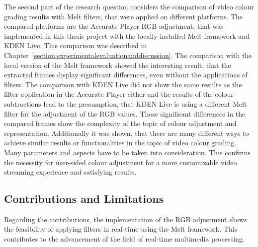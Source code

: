 \documentclass[../MasterThesis.tex]{subfiles}
\begin{document}
The second part of the research question considers the comparison of video colour grading results with Melt filters, that were applied on different platforms. The compared platforms are the Accurate Player RGB adjustment, that was implemented in this thesis project with the locally installed Melt framework and KDEN Live. This comparison was described in Chapter~\ref{section:experimentalevaluationanddiscussion}.
%
%
The comparison with the local version of the Melt framework showed the interesting result, that the extracted frames display significant differences, even without the applications of filters. 
The comparison with KDEN Live did not show the same results as the filter application in the Accurate Player either and the results of the colour subtractions lead to the presumption, that KDEN Live is using a different Melt filter for the adjustment of the RGB values.
%
Those significant differences in the compared frames show the complexity of the topic of colour adjustment and representation. 
%
%
Additionally it was shown, that there are many different ways to achieve similar results or functionalities in the topic of video colour grading. Many parameters and aspects have to be taken into consideration. This confirms the necessity for user-sided colour adjustment for a more customizable video streaming experience and satisfying results. 





\subsection{Contributions and Limitations} \label{subsection:contributionslimitations}



Regarding the contributions, the implementation of the RGB adjustment shows the feasibility of applying filters in real-time using the Melt framework.
This contributes to the advancement of the field of real-time multimedia processing.
\end{document}
